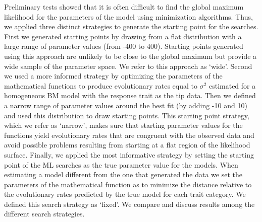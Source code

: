 Preliminary tests showed that it is often difficult to find the global maximum likelihood for the parameters of the model using minimization algorithms. Thus, we applied three distinct strategies to generate the starting point for the searches. First we generated starting points by drawing from a flat distribution with a large range of parameter values (from -400 to 400). Starting points generated using this approach are unlikely to be close to the global maximum but provide a wide sample of the parameter space. We refer to this approach as `wide'. Second we used a more informed strategy by optimizing the parameters of the mathematical functions to produce evolutionary rates equal to $\sigma^{2}$ estimated for a homogeneous BM model with the response trait as the tip data. Then we defined a narrow range of parameter values around the best fit (by adding -10 and 10) and used this distribution to draw starting points. This starting point strategy, which we refer as `narrow', makes sure that starting parameter values for the functions yield evolutionary rates that are congruent with the observed data and avoid possible problems resulting from starting at a flat region of the likelihood surface. Finally, we applied the most informative strategy by setting the starting point of the ML searches as the true parameter value for the models. When estimating a model different from the one that generated the data we set the parameters of the mathematical function as to minimize the distance relative to the evolutionary rates predicted by the true model for each trait category. We defined this search strategy as `fixed'. We compare and discuss results among the different search strategies.



